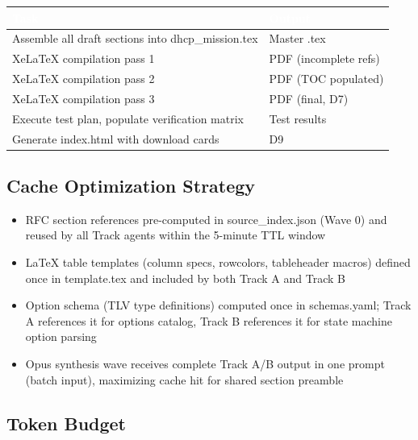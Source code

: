 \documentclass[11pt,letterpaper]{article}
\newcommand{\tableheader}[1]{\textbf{\sffamily\textcolor{white}{#1}}}
\begin{document}
\begin{center}
\begin{tabularx}{\textwidth}{L{4.5cm}X}
\toprule
{}
\tableheader{Task} & \tableheader{Output} \\
\midrule
Assemble all draft sections into dhcp\_mission.tex & Master .tex \\
XeLaTeX compilation pass 1 & PDF (incomplete refs) \\
XeLaTeX compilation pass 2 & PDF (TOC populated) \\
XeLaTeX compilation pass 3 & PDF (final, D7) \\
Execute test plan, populate verification matrix & Test results \\
Generate index.html with download cards & D9 \\
\bottomrule
\end{tabularx}
\end{center}

\subsection{Cache Optimization Strategy}

\begin{itemize}[noitemsep]
  \item RFC section references pre-computed in source\_index.json (Wave 0) and reused by all Track agents within the 5-minute TTL window
  \item LaTeX table templates (column specs, rowcolors, tableheader macros) defined once in template.tex and included by both Track A and Track B
  \item Option schema (TLV type definitions) computed once in schemas.yaml; Track A references it for options catalog, Track B references it for state machine option parsing
  \item Opus synthesis wave receives complete Track A/B output in one prompt (batch input), maximizing cache hit for shared section preamble
\end{itemize}

\subsection{Token Budget}
\end{document}
